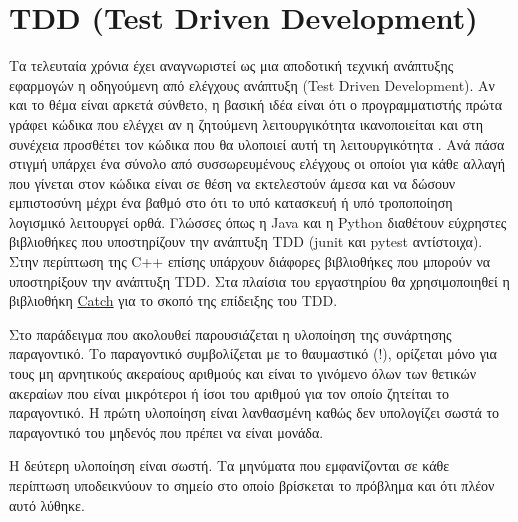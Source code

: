 




\section{TDD (Test Driven Development)}
Τα τελευταία χρόνια έχει αναγνωριστεί ως μια αποδοτική τεχνική ανάπτυξης εφαρμογών η οδηγούμενη από ελέγχους ανάπτυξη (Test Driven Development). Αν και το θέμα είναι αρκετά σύνθετο, η βασική ιδέα είναι ότι ο προγραμματιστής πρώτα γράφει κώδικα που ελέγχει αν η ζητούμενη λειτουργικότητα ικανοποιείται και στη συνέχεια προσθέτει τον κώδικα που θα υλοποιεί αυτή τη λειτουργικότητα \cite{butunclebob_tdd}. Ανά πάσα στιγμή υπάρχει ένα σύνολο από συσσωρευμένους ελέγχους οι οποίοι για κάθε αλλαγή που γίνεται στον κώδικα είναι σε θέση να εκτελεστούν άμεσα και να δώσουν εμπιστοσύνη μέχρι ένα βαθμό στο ότι το υπό κατασκευή ή υπό τροποποίηση λογισμικό λειτουργεί ορθά. Γλώσσες όπως η Java και η Python διαθέτουν εύχρηστες βιβλιοθήκες που υποστηρίζουν την ανάπτυξη TDD (junit και pytest αντίστοιχα). Στην περίπτωση της C++ επίσης υπάρχουν διάφορες βιβλιοθήκες που μπορούν να υποστηρίξουν την ανάπτυξη TDD. Στα πλαίσια του εργαστηρίου θα χρησιμοποιηθεί η βιβλιοθήκη \href{https://github.com/philsquared/Catch}{Catch} για το σκοπό της επίδειξης του TDD.

Στο παράδειγμα που ακολουθεί παρουσιάζεται η υλοποίηση της συνάρτησης παραγοντικό. Το παραγοντικό συμβολίζεται με το θαυμαστικό (!), ορίζεται μόνο για τους μη αρνητικούς ακεραίους αριθμούς και είναι το γινόμενο όλων των θετικών ακεραίων που είναι μικρότεροι ή ίσοι του αριθμού για τον οποίο ζητείται το παραγοντικό. Η πρώτη υλοποίηση είναι λανθασμένη καθώς δεν υπολογίζει σωστά το παραγοντικό του μηδενός που πρέπει να είναι μονάδα. 





Η δεύτερη υλοποίηση είναι σωστή. Τα μηνύματα που εμφανίζονται σε κάθε περίπτωση υποδεικνύουν το σημείο στο οποίο βρίσκεται το πρόβλημα και ότι πλέον αυτό λύθηκε.



